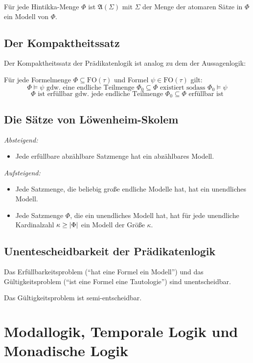 \documentclass[a4paper,parskip=half*,DIV=15,fontsize=11pt]{scrartcl}
\DeclarePairedDelimiter\abs{\lvert}{\rvert}
\newcommand{\A}{\mathfrak{A}}
\newcommand{\FO}{\mathrm{FO}}
\begin{document}
Für jede Hintikka-Menge $\Phi$ ist $\A(\Sigma)$ mit $\Sigma$ der Menge der atomaren Sätze in $\Phi$ ein Modell von $\Phi$.

\subsection{Der Kompaktheitssatz}

Der Kompaktheitssatz der Prädikatenlogik ist analog zu dem der Aussagenlogik:

Für jede Formelmenge $\Phi \subseteq \FO(\tau)$ und Formel $\psi \in \FO(\tau)$ gilt:
\[\Phi \models \psi \text{ gdw.\ eine endliche Teilmenge $\Phi_0 \subseteq \Phi$ existiert sodass } \Phi_0 \models \psi\]
\[\Phi \text{ ist erfüllbar gdw.\ jede endliche Teilmenge $\Phi_0 \subseteq \Phi$ erfüllbar ist}\]

\subsection{Die Sätze von Löwenheim-Skolem}

\emph{Absteigend:}
\begin{itemize}
\item[] Jede erfüllbare abzählbare Satzmenge hat ein abzählbares Modell.
\end{itemize}

\emph{Aufsteigend:}
\begin{itemize}
\item Jede Satzmenge, die beliebig große endliche Modelle hat, hat ein unendliches Modell.
\item Jede Satzmenge $\Phi$, die ein unendliches Modell hat, hat für jede unendliche Kardinalzahl $\kappa \ge \abs{\Phi}$ ein Modell der Größe $\kappa$.
\end{itemize}

\subsection{Unentescheidbarkeit der Prädikatenlogik}

Das Erfüllbarkeitsproblem (``hat eine Formel ein Modell'') und das Gültigkeitsproblem (``ist eine Formel eine Tautologie'') sind unentscheidbar.

Das Gültigkeitsproblem ist semi-entscheidbar.

\section{Modallogik, Temporale Logik und Monadische Logik}
\end{document}
